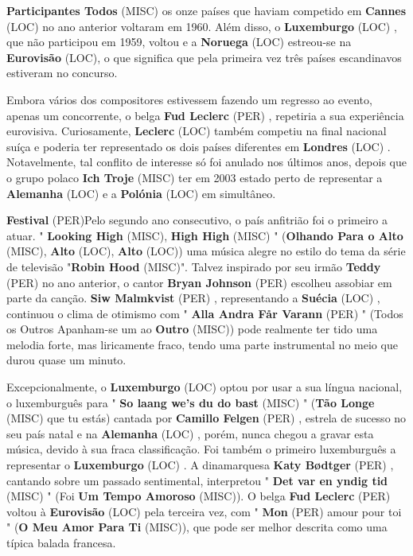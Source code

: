 \documentclass[12pt,a4paper]{article}
\begin{document}
\textbf{Participantes Todos} (MISC) os onze países que haviam competido em \textbf{Cannes} (LOC) no ano anterior voltaram em 1960. Além disso, o \textbf{Luxemburgo} (LOC) , que não participou em 1959, voltou e a \textbf{Noruega} (LOC) estreou-se na \textbf{Eurovisão} (LOC), o que significa que pela primeira vez três países escandinavos estiveram no concurso.

Embora vários dos compositores estivessem fazendo um regresso ao evento, apenas um concorrente, o belga \textbf{Fud Leclerc} (PER) , repetiria a sua experiência eurovisiva. Curiosamente, \textbf{Leclerc} (LOC) também competiu na final nacional suíça e poderia ter representado os dois países diferentes em \textbf{Londres} (LOC) . Notavelmente, tal conflito de interesse só foi anulado nos últimos anos, depois que o grupo polaco \textbf{Ich Troje} (MISC) ter em 2003 estado perto de representar a \textbf{Alemanha} (LOC) e a \textbf{Polónia} (LOC) em simultâneo.



\textbf{Festival} (PER)Pelo segundo ano consecutivo, o país anfitrião foi o primeiro a atuar. " \textbf{Looking High} (MISC), \textbf{High High} (MISC) " (\textbf{Olhando Para o Alto} (MISC), \textbf{Alto} (LOC), \textbf{Alto} (LOC)) uma música alegre no estilo do tema da série de televisão "\textbf{Robin Hood} (MISC)". Talvez inspirado por seu irmão \textbf{Teddy} (PER) no ano anterior, o cantor \textbf{Bryan Johnson} (PER) escolheu assobiar em parte da canção. \textbf{Siw Malmkvist} (PER) , representando a \textbf{Suécia} (LOC) , continuou o clima de otimismo com " \textbf{Alla Andra Får Varann} (PER) " (Todos os Outros Apanham-se um ao \textbf{Outro} (MISC)) pode realmente ter tido uma melodia forte, mas liricamente fraco, tendo uma parte instrumental no meio que durou quase um minuto.

Excepcionalmente, o \textbf{Luxemburgo} (LOC) optou por usar a sua língua nacional, o luxemburguês para " \textbf{So laang we's du do bast} (MISC) " (\textbf{Tão Longe} (MISC) que tu estás) cantada por \textbf{Camillo Felgen} (PER) , estrela de sucesso no seu país natal e na \textbf{Alemanha} (LOC) , porém, nunca chegou a gravar esta música, devido à sua fraca classificação. Foi também o primeiro luxemburguês a representar o \textbf{Luxemburgo} (LOC) . A dinamarquesa \textbf{Katy Bødtger} (PER) , cantando sobre um passado sentimental, interpretou " \textbf{Det var en yndig tid} (MISC) " (Foi \textbf{Um Tempo Amoroso} (MISC)). O belga \textbf{Fud Leclerc} (PER) voltou à \textbf{Eurovisão} (LOC) pela terceira vez, com " \textbf{Mon} (PER) amour pour toi " (\textbf{O Meu Amor Para Ti} (MISC)), que pode ser melhor descrita como uma típica balada francesa.
\end{document}
